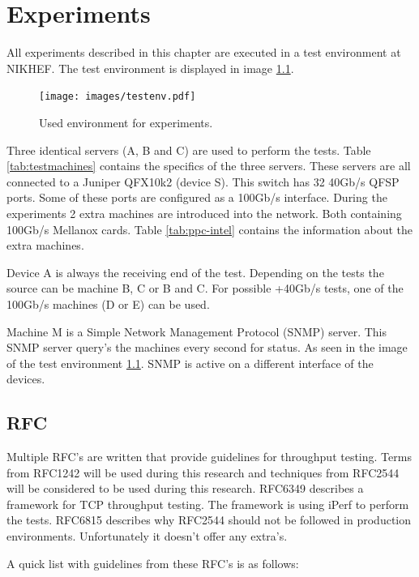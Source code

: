\chapter{Experiments}\label{ch:experiments}
All experiments described in this chapter are executed in a test environment at NIKHEF. The test environment is displayed in image \ref{fig:testenv}.

\begin{figure}
  \texttt{[image: images/testenv.pdf]}
  \caption{Used environment for experiments.}
  \label{fig:testenv}
\end{figure}

Three identical servers (A, B and C)  are used to perform the tests. Table \ref{tab:testmachines} contains the specifics of the three servers. 
These servers are all connected to a Juniper QFX10k2 (device S). This switch has 32 40Gb/s QFSP ports. 
Some of these ports are configured as a 100Gb/s interface. 
During the experiments 2 extra machines are introduced into the network. Both containing 100Gb/s Mellanox cards.
Table \ref{tab:ppc-intel} contains the information about the extra machines.   


Device A is always the receiving end of the test. Depending on the tests the source can be machine B, C or B and C.
For possible +40Gb/s tests, one of the 100Gb/s machines (D or E) can be used.

Machine M is a Simple Network Management Protocol (SNMP) server. This SNMP server query's the machines every second for status. 
As seen in the image of the test environment \ref{fig:testenv}. SNMP is active on a different interface of the devices.  

\section{RFC}\label{sub:rfc}
Multiple RFC's are written that provide guidelines for throughput testing.
Terms from RFC1242 \cite{rfc1242} will be used during this research and techniques from RFC2544 \cite{rfc2544} will be considered to be used during this research.
RFC6349 \cite{rfc6349} describes a framework for TCP throughput testing. The framework is using iPerf to perform the tests.
RFC6815 \cite{rfc6815} describes why RFC2544 should not be followed in production environments. Unfortunately it doesn't offer any extra's. 

A quick list with guidelines from these RFC's is as follows:

